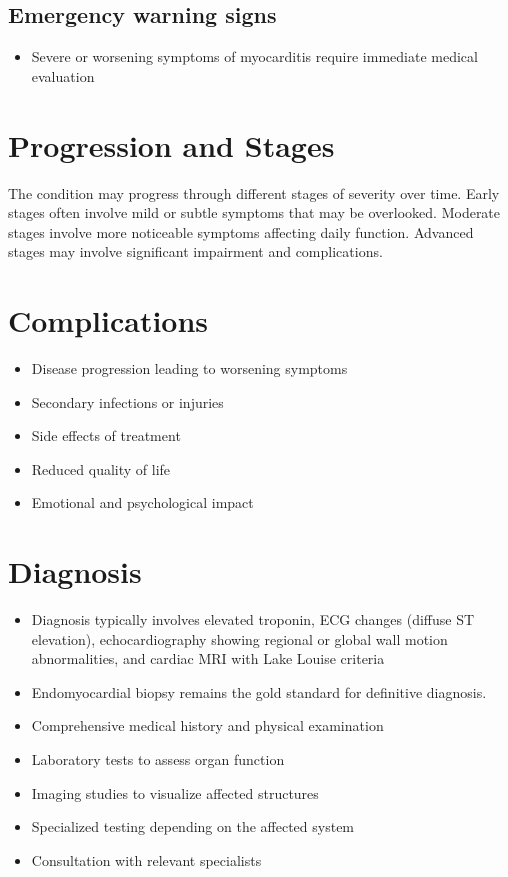 \subsection{Emergency warning signs}
\begin{itemize}[noitemsep]
  \item Severe or worsening symptoms of myocarditis require immediate medical evaluation
\end{itemize}
\section{Progression and Stages}
The condition may progress through different stages of severity over time. Early stages often involve mild or subtle symptoms that may be overlooked. Moderate stages involve more noticeable symptoms affecting daily function. Advanced stages may involve significant impairment and complications.
\section{Complications}
\begin{itemize}[noitemsep]
  \item Disease progression leading to worsening symptoms
  \item Secondary infections or injuries
  \item Side effects of treatment
  \item Reduced quality of life
  \item Emotional and psychological impact
\end{itemize}
\section{Diagnosis}
\begin{itemize}[noitemsep]
  \item Diagnosis typically involves elevated troponin, ECG changes (diffuse ST elevation), echocardiography showing regional or global wall motion abnormalities, and cardiac MRI with Lake Louise criteria
  \item Endomyocardial biopsy remains the gold standard for definitive diagnosis.
  \item Comprehensive medical history and physical examination
  \item Laboratory tests to assess organ function
  \item Imaging studies to visualize affected structures
  \item Specialized testing depending on the affected system
  \item Consultation with relevant specialists
\end{itemize}
